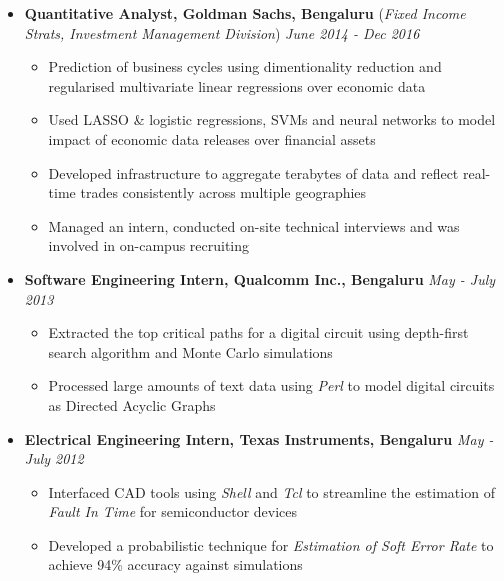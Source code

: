 \documentclass[10pt,a4paper,English]{article}
\newcommand\itemyear[1]{\hfill \emph{\color{itemyear} #1}}
\newcommand\itemenv{\setlength\itemsep{0.5pt} \addtolength{\itemindent}{-5mm}\vspace{-1.5mm}}
\begin{document}
\begin{itemize}
    \item \textbf{Quantitative Analyst, Goldman Sachs, Bengaluru} \hfill (\emph{Fixed Income Strats, Investment Management Division}) \itemyear{June 2014 - Dec 2016}
        \begin{itemize} \itemenv 
            \item Prediction of business cycles using dimentionality reduction and regularised multivariate linear regressions over economic data
            \item Used LASSO \& logistic regressions, SVMs and neural networks to model impact of economic data releases over financial assets
            \item Developed infrastructure to aggregate terabytes of data and reflect real-time trades consistently across multiple geographies
            \item Managed an intern, conducted on-site technical interviews and was involved in on-campus recruiting
        \end{itemize}

    \item \textbf{Software Engineering Intern, Qualcomm Inc., Bengaluru} \itemyear{May - July 2013}
        \begin{itemize} \itemenv
            \item Extracted the top critical paths for a digital circuit using depth-first search algorithm and Monte Carlo simulations
            \item Processed large amounts of text data using \textit{Perl} to model digital circuits as Directed Acyclic Graphs
        \end{itemize}

    \item \textbf{Electrical Engineering Intern, Texas Instruments, Bengaluru} \itemyear{May - July 2012}
        \begin{itemize} \itemenv
            \item Interfaced CAD tools using \textit{Shell} and \textit{Tcl} to streamline the estimation of \textit{Fault In Time} for semiconductor devices
            \item Developed a probabilistic technique for \emph{Estimation of Soft Error Rate} to achieve 94\% accuracy against simulations
        \end{itemize}


\end{itemize}
\end{document}
